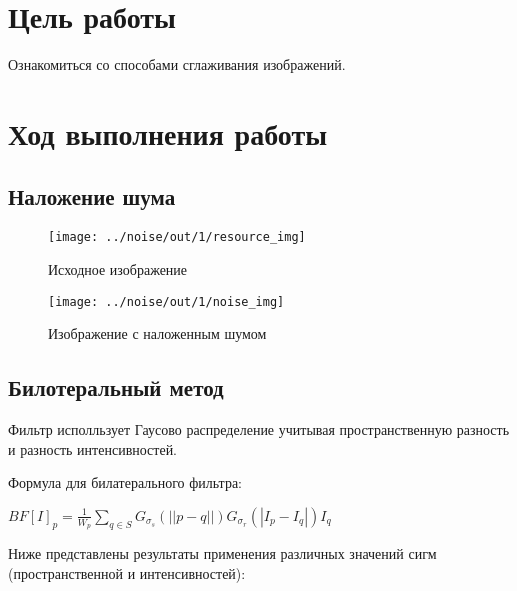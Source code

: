 







\section{Цель работы}

Ознакомиться со способами сглаживания изображений.


\section{Ход выполнения работы}


\subsection{Наложение шума}

\begin{figure}[H]
	\begin{center}
		\texttt{[image: ../noise/out/1/resource\_img]}
		\caption{Исходное изображение }
	\end{center}
\end{figure}

\begin{figure}[H]
	\begin{center}
		\texttt{[image: ../noise/out/1/noise\_img]}
		\caption{Изображение с наложенным шумом}
	\end{center}
\end{figure}

\subsection{Билотеральный метод}

Фильтр исполльзует Гаусово распределение учитывая пространственную разность и разность интенсивностей.

Формула для билатерального фильтра:

$BF[I]_p = \frac{1}{W_p} \sum\limits_{q \in S} G_{\sigma_s} (||p-q||) G_{\sigma_r} (|I_p-I_q|) I_q$

Ниже представлены результаты применения различных значений сигм (пространственной и интенсивностей):

